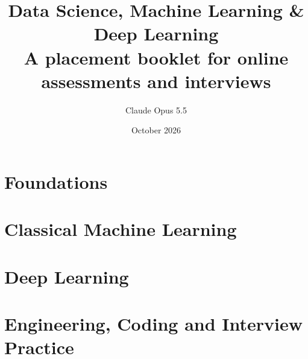 \documentclass[11pt,a4paper,oneside]{book}
\title{\textbf{Data Science, Machine Learning \& Deep Learning}\\[6pt]
\large A placement booklet for online assessments and interviews\\[4pt]}
\author{Claude Opus 5.5}
\date{October 2026}
\theoremstyle{definition}
\begin{document}
\frontmatter
\maketitle
\tableofcontents



\mainmatter
\part{Foundations}



\part{Classical Machine Learning}







\part{Deep Learning}






\part{Engineering, Coding and Interview Practice}





\appendix

\end{document}

